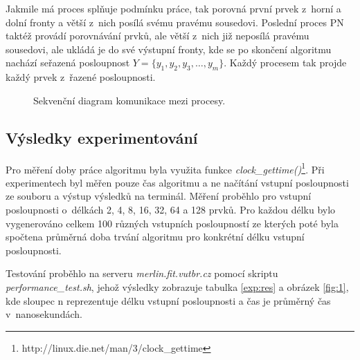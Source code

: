 \documentclass[10pt,a4paper,notitlepage]{article}
\begin{document}
Jakmile má proces splňuje podmínku práce, tak porovná
první prvek z~horní a dolní fronty a větší z~nich posílá svému pravému
sousedovi. Poslední proces PN taktéž provádí porovnávání prvků, ale větší z~nich
již neposílá pravému sousedovi, ale ukládá je do své výstupní fronty, kde se po
skončení algoritmu nachází seřazená posloupnost $Y=\{y_{1}, y_{2}, y_{3}, \dots,
y_{m}\}$.  Každý procesem tak projde každý prvek z~řazené posloupnosti.  

\begin{figure}[h]
	\centering
  \label{pic:3}
  \caption{Sekvenční diagram komunikace mezi procesy.}
\end{figure}

\subsection{Výsledky experimentování}
Pro měření doby práce algoritmu byla využita funkce
\textit{clock\_gettime()}\footnote{http://linux.die.net/man/3/clock\_gettime}.
Při experimentech byl měřen pouze čas algoritmu a ne načítání vstupní
posloupnosti ze souboru a výstup výsledků na terminál. Měření proběhlo pro
vstupní posloupnosti o~délkách 2, 4, 8, 16, 32, 64 a 128 prvků. Pro každou délku
bylo vygenerováno celkem 100 různých vstupních posloupností ze kterých poté byla spočtena
průměrná doba trvání algoritmu pro konkrétní délku vstupní posloupnosti.

Testování proběhlo na serveru \textit{merlin.fit.vutbr.cz} pomocí skriptu
\textit{performance\_test.sh}, jehož výsledky zobrazuje tabulka \ref{exp:res} a
obrázek \ref{fig:1}, kde sloupec n reprezentuje délku vstupní posloupnosti a čas
je průměrný čas v~nanosekundách.
\end{document}

